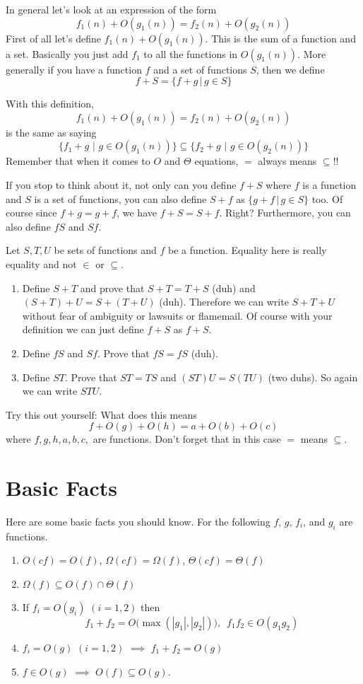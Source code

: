 In general let's look at an expression of the form
\[
  f_1(n) + O(g_1(n)) = f_2(n) + O(g_2(n))
\]
First of all let's define $f_1(n) + O(g_1(n))$. This is the sum of
a function and a set. Basically you just add $f_1$ to all the
functions in $O(g_1(n))$. More generally if you have a function
$f$ and a set of functions $S$, then we define
\[
 f + S = \{ f + g \,|\, g \in S \}
\]

With this definition,
\[
 f_1(n) + O(g_1(n)) = f_2(n) + O(g_2(n))
\]
is the same as saying
\[
 \biggl\{ f_1 + g \,\,\biggl|\,\, g \in O(g_1(n)) \biggr\}
 \subseteq
 \biggl\{ f_2 + g \,\,\biggl|\,\, g \in O(g_2(n)) \biggr\}
\]
Remember that when it comes to $O$ and $\Theta$ equations, $=$
always means $\subseteq$!!


If you stop to think about it, not only can you define $f + S$
where $f$ is a function and $S$ is a set of functions, you can
also define $S + f$ as $\{ g + f \,|\, g \in S \}$ too. Of course
since $f+g = g + f$, we have $f + S = S + f$. Right? Furthermore,
you can also define $fS$ and $Sf$.


\begin{ex}
Let $S, T, U$ be sets of functions and $f$ be a function. Equality
here is really equality and not $\in$ or $\subseteq$.
\begin{enumerate}
 \item Define $S + T$ and prove that $S + T = T + S$ (duh) and
 $(S+T)+U = S+(T+U)$ (duh).
 Therefore we can write $S+T+U$ without fear of ambiguity or
 lawsuits or flamemail. Of course with your definition we can just
 define $f+S$ as ${f} + S$.
 \item Define $fS$ and $Sf$. Prove that $fS = fS$ (duh).
 \item Define $ST$. Prove that $ST = TS$ and $(ST)U = S(TU)$
 (two duhs). So again we can write $STU$.
\end{enumerate}
\end{ex}


\begin{ex}
Try this out yourself: What does this means
\[
 f + O(g) + O(h) = a + O(b) + O(c)
\]
where $f,g,h,a,b,c,$ are functions. Don't forget that in this case
$=$ means $\subseteq$.\end{ex}

\section{Basic Facts}

Here are some basic facts you should know. For the following $f$,
$g$, $f_i$, and $g_i$ are functions.
\begin{enumerate}
 \item $O(cf) = O(f)$, $\Omega(cf) = \Omega(f)$, $\Theta(cf) =
 \Theta(f)$
 \item $\Omega(f) \subseteq O(f) \cap \Theta(f)$
 \item If $f_i = O(g_i)$ $(i=1,2)$ then
 \[
  f_1+f_2 = O \bigl( \max(|g_1|,|g_2|) \bigr), \,\,\, f_1 f_2 \in O(g_1 g_2)
 \]
 \item $f_i = O(g)$ $(i=1,2)$ $\implies$ $f_1+f_2 = O(g)$
 \item $f \in O(g)$ $\implies$ $O(f) \subseteq O(g)$.
\end{enumerate}


